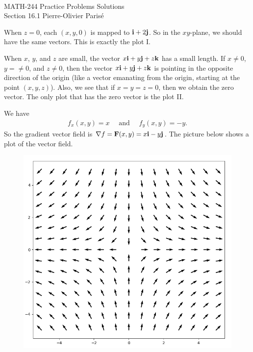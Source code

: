 


	\noindent \hrulefill \\
	MATH-244 \semester \hfill Practice Problems Solutions\\
	Section 16.1 \hfill Pierre-Olivier Paris{\'e} \\\vspace*{-1cm}
	
	\noindent\hrulefill
	
	\spc	

	When $z = 0$, each $(x, y, 0)$ is mapped to $\mathbf{i} + 2 \mathbf{j}$. So in the $xy$-plane, we should have the same vectors. This is exactly the plot I.

	\spc

	When $x$, $y$, and $z$ are small, the vector $x\mathbf{i} + y \mathbf{j} + z \mathbf{k}$ has a small length. If $x \neq 0$, $y = \neq 0$, and $z \neq 0$, then the vector $x\mathbf{i} + y \mathbf{j} + z \mathbf{k}$ is pointing in the opposite direction of the origin (like a vector emanating from the origin, starting at the point $(x, y, z)$). Also, we see that if $x = y = z = 0$, then we obtain the zero vector. The only plot that has the zero vector is the plot II.
	
	\spc
	
	We have
		\begin{align*}
		f_x (x, y) = x \quad \text{ and } \quad f_y (x, y) = -y .
		\end{align*}
	So the gradient vector field is $\nabla f = \mathbf{F} (x, y) = x\mathbf{i} - y \mathbf{j}$. The picture below shows a plot of the vector field.
		\begin{figure}[h]
		\centering
		\includegraphics[scale=0.4]{vectorFieldGradient.png}
		\end{figure}

